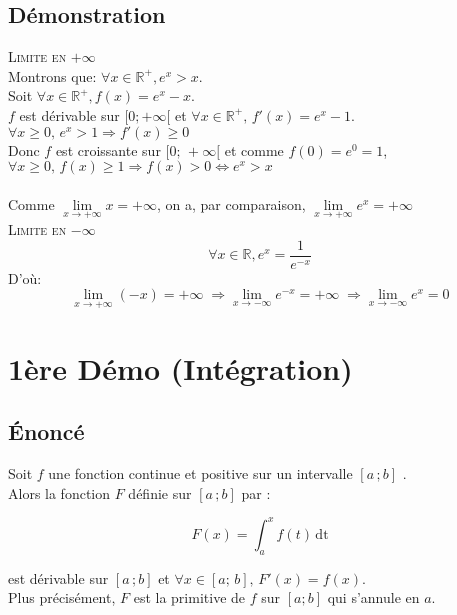 \documentclass[12px]{article}
\newcommand\I{$[a\,;b]$ }
\begin{document}
	\subsection{Démonstration}
	\textsc{Limite en $+\infty$}\\
	Montrons que: $\forall x\in\mathbb{R}^+, e^x >x$.\\
	Soit $\forall x\in\mathbb{R}^+, f(x)=e^x -x$.\\
	$f$ est dérivable sur $[0; +\infty[$ et $\forall x\in\mathbb{R}^+, \,f'(x)=e^x -1$.\\
	$\forall x\geq 0, \,e^x >1 \Rightarrow f'(x)\geq 0$\\
	Donc $f$ est croissante sur $[0;\, +\infty[$ et comme $f(0)= e^0= 1$,\\
	$\forall x\geq 0, \,f(x)\geq 1\Rightarrow f(x)>0 \Leftrightarrow e^x > x$\\
	\\
	Comme $\lim\limits_{x \rightarrow +\infty}x=+\infty$, on a, par comparaison, $\lim\limits_{x\rightarrow +\infty}e^x=+\infty$\\
	\newpage
	\textsc{Limite en $-\infty$}
	\begin{displaymath}
		\forall x\in\mathbb{R}, e^x = \frac{1}{e^{-x}}
	\end{displaymath}
	D'où:\\
	\begin{displaymath}
		\lim\limits_{x\rightarrow +\infty}(-x)=+\infty \;\Rightarrow \lim\limits_{x\rightarrow -\infty}e^{-x}=+\infty \;\Rightarrow \lim\limits_{x\rightarrow -\infty}e^x=0
	\end{displaymath}
	
	\section{1ère Démo (Intégration)}
	
	\subsection{\'Enoncé}
	Soit $f$ une fonction continue et positive sur un intervalle \I.\\
	Alors la fonction $F$ définie sur \I par :
	\begin{center}
		\begin{displaymath}
			F(x) = \int_{a}^{x}f(t)\,\mathrm{dt}
		\end{displaymath}
	\end{center}
	est dérivable sur \I et $\forall x\in [a;\, b],\, F'(x)=f(x)$.\\
	Plus précisément, $F$ est la primitive de $f$ sur $[a;b]$ qui s'annule en $a$.
	
\end{document}
